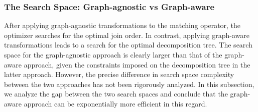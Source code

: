 \subsubsection{The Search Space: Graph-agnostic vs Graph-aware}
\label{sec:compare-search-space}
After applying graph-agnostic transformations to the matching operator, the optimizer searches for the optimal join order. In contrast, applying graph-aware transformations leads to a search for the optimal decomposition tree. The search space for the graph-agnostic approach is clearly larger than that of the graph-aware approach, given the constraints imposed on the decomposition tree in the latter approach. However, the precise difference in search space complexity between the two approaches has not been rigorously analyzed.
In this subsection, we analyze the gap between the two search spaces and conclude that the graph-aware approach can be exponentially more efficient in this regard.


